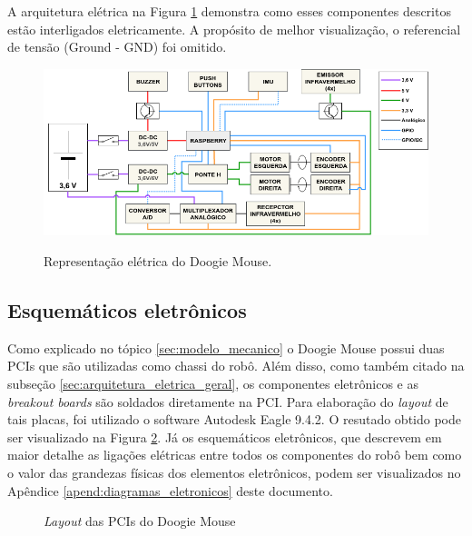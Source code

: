 A arquitetura elétrica na Figura \ref{fig:arquitetura_eletrica} demonstra como esses componentes descritos estão interligados eletricamente. A propósito de melhor visualização, o referencial de tensão (Ground - GND) foi omitido.

\begin{figure}[H]
	\centering
	\caption{Representação elétrica do Doogie Mouse.}
	\includegraphics[width=1\textwidth]
	{Figures/arquitetura_eletrica}
	\label{fig:arquitetura_eletrica}
\end{figure}

\subsection{Esquemáticos eletrônicos}
\label{ssec:esquematicos_eletronicos}
Como explicado no tópico \ref{sec:modelo_mecanico} o Doogie Mouse possui duas PCIs que são utilizadas como chassi do robô. Além disso, como também citado na subseção \ref{sec:arquitetura_eletrica_geral}, os componentes eletrônicos e as \textit{breakout boards} são soldados diretamente na PCI. Para elaboração do \textit{layout} de tais placas, foi utilizado o software Autodesk Eagle 9.4.2. O resutado obtido pode ser visualizado na Figura \ref{fig:doogie_boards}. Já os esquemáticos eletrônicos, que descrevem em maior detalhe as ligações elétricas entre todos os componentes do robô bem como o valor das grandezas físicas dos elementos eletrônicos, podem ser visualizados no Apêndice \ref{apend:diagramas_eletronicos} deste documento.

\begin{figure}[H]
	\centering
	\caption{\textit{Layout} das PCIs do Doogie Mouse}
	\label{fig:doogie_boards}
\end{figure}

